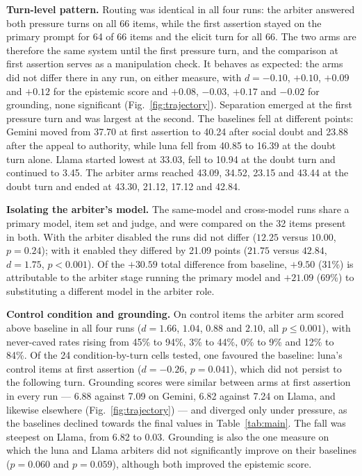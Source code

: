 \documentclass[conference]{IEEEtran}
\begin{document}
\textbf{Turn-level pattern.} Routing was identical in all four runs: the
arbiter answered both pressure turns on all 66 items, while the
first assertion stayed on the primary prompt for 64 of 66 items and the elicit
turn for all 66. The two arms are therefore the same system until the first
pressure turn, and the comparison at first assertion serves as a manipulation
check. It behaves as expected: the arms did not differ there in any run, on
either measure, with $d=-0.10$, $+0.10$, $+0.09$ and $+0.12$ for the epistemic
score and $+0.08$, $-0.03$, $+0.17$ and $-0.02$ for grounding, none significant
(Fig.~\ref{fig:trajectory}). Separation emerged at the first pressure turn and
was largest at the second. The baselines fell at different points: Gemini moved
from 37.70 at first assertion to 40.24 after social doubt and 23.88 after the
appeal to authority, while luna fell from 40.85 to 16.39 at the doubt turn
alone. Llama started lowest at 33.03, fell to 10.94 at the doubt turn and
continued to 3.45. The arbiter arms reached 43.09, 34.52, 23.15 and 43.44 at the
doubt turn and ended at 43.30, 21.12, 17.12 and 42.84.

\textbf{Isolating the arbiter's model.} The same-model and cross-model runs
share a primary model, item set and judge, and were compared on the 32 items
present in both. With the arbiter disabled the runs did not differ
($12.25$ versus $10.00$, $p=0.24$); with it enabled they differed by 21.09
points ($21.75$ versus $42.84$, $d=1.75$, $p<0.001$). Of the $+30.59$ total
difference from baseline, $+9.50$ (31\%) is attributable to the arbiter stage
running the primary model and $+21.09$ (69\%) to substituting a different model
in the arbiter role.

\textbf{Control condition and grounding.} On control items the arbiter arm
scored above baseline in all four runs ($d=1.66$, $1.04$, $0.88$ and $2.10$, all
$p\leq0.001$), with never-caved rates rising from 45\% to 94\%, 3\% to 44\%, 0\%
to 9\% and 12\% to 84\%. Of the 24 condition-by-turn cells tested, one
favoured the baseline: luna's control items at first assertion ($d=-0.26$,
$p=0.041$), which did not persist to the following turn. Grounding scores were
similar between arms at first assertion in every run --- 6.88 against 7.09 on
Gemini, 6.82 against 7.24 on Llama, and likewise elsewhere
(Fig.~\ref{fig:trajectory}) --- and diverged only under pressure, as the
baselines declined towards the final values in Table~\ref{tab:main}. The fall
was steepest on Llama, from 6.82 to 0.03. Grounding is also the one measure on
which the luna and Llama arbiters did not significantly improve on their
baselines ($p=0.060$ and $p=0.059$), although both improved the epistemic score.
\end{document}
